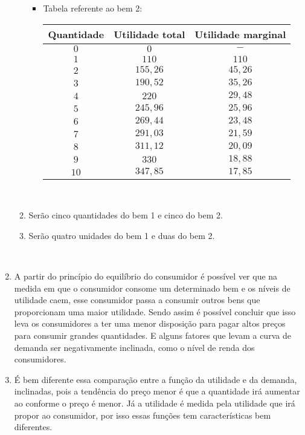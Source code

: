\documentclass[a4paper, 12pt]{article}
\begin{document}
\begin{enumerate}
\begin{enumerate}
\begin{itemize}
			\item Tabela referente ao bem 2:
			\begin{table}[H]
				\centering
				\begin{tabular}{|c|c|c|}
					\hline
					Quantidade & Utilidade total & Utilidade marginal \\ \hline
					$0$ & $0$ & $-$\\ \hline
					$1$ & $110$ & $110$\\ \hline
					$2$ & $155,26$ & $45,26$\\ \hline
					$3$ & $190,52$ & $35,26$\\ \hline
					$4$ & $220$ & $29,48$\\ \hline
					$5$ & $245,96$ & $25,96$\\ \hline
					$6$ & $269,44$ & $23,48$\\ \hline
					$7$ & $291,03$ & $21,59$\\ \hline
					$8$ & $311,12$ & $20,09$\\ \hline
					$9$ & $330$ & $18,88$\\ \hline
					$10$ & $347,85$ & $17,85$\\ \hline
				\end{tabular}
		\end{table}\\
		\end{itemize}
		
		\item Serão cinco quantidades do bem 1 e cinco do bem 2.\\
		
		\item Serão quatro unidades do bem 1 e duas do bem 2.\\
	\end{enumerate}
	\\

	\item A partir do princípio do equilíbrio do consumidor é possível ver que na medida em que o consumidor consome um determinado bem e os níveis de utilidade caem, esse consumidor passa a consumir outros bens que proporcionam uma maior utilidade. Sendo assim é possível concluir que isso leva os consumidores a ter uma menor disposição para pagar altos preços para consumir grandes quantidades. E alguns fatores que levam a curva de demanda ser negativamente inclinada, como o nível de renda dos consumidores.
	\\

	\item É bem diferente essa comparação entre a função da utilidade e da demanda, inclinadas, pois a tendência do preço menor é que a quantidade irá aumentar ao conforme o preço é menor. Já a utilidade é medida pela utilidade que irá propor ao consumidor, por isso essas funções tem características bem diferentes.
	\\


\end{enumerate}
\end{document}
